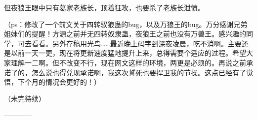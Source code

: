\begin{this_body}
但夜狼王眼中只有葛家老族长，顶着狂攻，也要杀了老族长泄愤。

（ps：修改了一个前文关于四转驭狼蛊的bug，以及万狼王的bug。万分感谢兄弟姐妹们的提醒！方源之前并无四转奴隶蛊，夜狼王之前也没有万兽王。感兴趣的同学，可去看看。另外存稿用光鸟……最近晚上码字到深夜凌晨，吃不消啊。主要还是以前一天一更，现在将更新速度猛地提升上来，总得需要个适应的过程。希望大家理解一二啊。但不改变不行，现在网文这样的环境，两更是必须的。再说之前承诺了的，怎么说也得兑现承诺啊，我这次誓死也要捍卫我的节操。这点已经有了觉悟，下个月的情况会更好的！）

（未完待续）

------------

\end{this_body}

